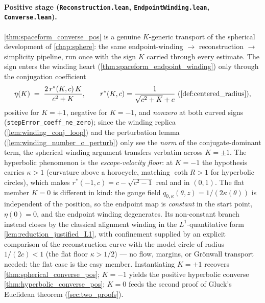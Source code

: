 \paragraph{Positive stage (\texttt{Reconstruction.lean},
\texttt{EndpointWinding.lean}, \texttt{Converse.lean}).}
\cref{thm:spaceform_converse_pos} is a genuine $K$-generic transport of
the spherical development of \cref{chap:sphere}: the same
endpoint-winding $\to$ reconstruction $\to$ simplicity pipeline, run once with the
sign $K$ carried through every estimate. The sign enters the winding
heart (\cref{thm:spaceform_endpoint_winding}) only through the conjugation
coefficient
\[
  \eta(K)\;=\;\frac{2\,r^\ast(K,c)\,K}{c^2+K},
  \qquad r^\ast(K,c)=\frac{1}{\sqrt{c^2+K}+c}
  \ \text{(\cref{def:centered_radius})},
\]
positive for $K=+1$, negative for $K=-1$, and
\emph{nonzero} at both curved signs (\texttt{stepError\_coeff\_ne\_zero});
since the winding replica
(\cref{lem:winding_conj_loop}) and the perturbation lemma
(\cref{lem:winding_number_c_perturb}) only see the \emph{norm} of the
conjugate-dominant term, the spherical winding argument transfers verbatim
across $K=\pm1$. The
hyperbolic phenomenon is the \emph{escape-velocity floor}: at
$K=-1$ the hypothesis carries $\kappa>1$ (curvature above a horocycle,
matching $\operatorname{coth}R>1$ for hyperbolic circles), which makes
$r^\ast(-1,c)=c-\sqrt{c^2-1}$ real and in $(0,1)$. The flat member
$K=0$ is different in kind: the gauge field
$q_{0,\kappa}(\theta,z)=1/(2\kappa(\theta))$ is independent of the position,
so the endpoint map is \emph{constant} in the start point, $\eta(0)=0$, and
the endpoint winding degenerates. Its non-constant branch instead closes by
the classical alignment winding in the $L^1$-quantitative form
\cref{lem:reduction_justified_L1}, with confinement supplied by an explicit
comparison of the reconstruction curve with the model circle of radius
$1/(2c)<1$ (the flat floor $\kappa>1/2$) — no flow, margins, or Gr\"onwall
transport needed: the flat case is the easy member. Instantiating
$K=+1$ recovers \cref{thm:spherical_converse_pos}; $K=-1$
yields the positive hyperbolic converse \cref{thm:hyperbolic_converse_pos};
$K=0$ feeds the second proof of Gluck's Euclidean theorem
(\cref{sec:two_proofs}).

